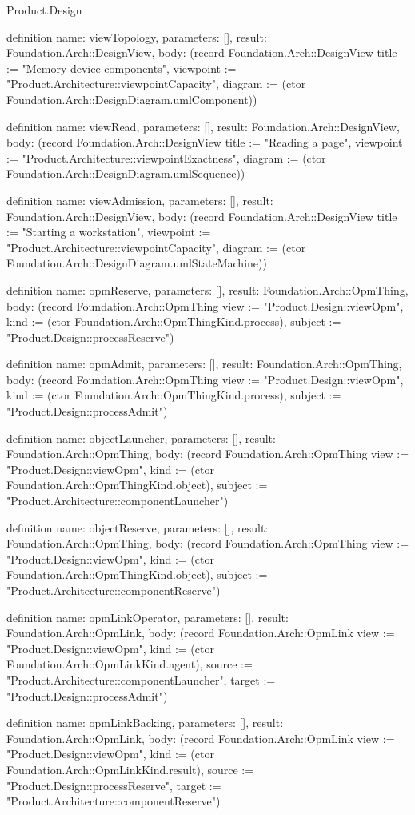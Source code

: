 \begin{lexlean}{Product.Design}
\begin{semanticmodule}
definition{
  name: viewTopology, parameters: [], result: Foundation.Arch::DesignView,
  body: (record Foundation.Arch::DesignView {title := "Memory device components", viewpoint := "Product.Architecture::viewpointCapacity", diagram := (ctor Foundation.Arch::DesignDiagram.umlComponent)})
}

definition{
  name: viewRead, parameters: [], result: Foundation.Arch::DesignView,
  body: (record Foundation.Arch::DesignView {title := "Reading a page", viewpoint := "Product.Architecture::viewpointExactness", diagram := (ctor Foundation.Arch::DesignDiagram.umlSequence)})
}

definition{
  name: viewAdmission, parameters: [], result: Foundation.Arch::DesignView,
  body: (record Foundation.Arch::DesignView {title := "Starting a workstation", viewpoint := "Product.Architecture::viewpointCapacity", diagram := (ctor Foundation.Arch::DesignDiagram.umlStateMachine)})
}

definition{
  name: opmReserve, parameters: [], result: Foundation.Arch::OpmThing,
  body: (record Foundation.Arch::OpmThing {view := "Product.Design::viewOpm", kind := (ctor Foundation.Arch::OpmThingKind.process), subject := "Product.Design::processReserve"})
}

definition{
  name: opmAdmit, parameters: [], result: Foundation.Arch::OpmThing,
  body: (record Foundation.Arch::OpmThing {view := "Product.Design::viewOpm", kind := (ctor Foundation.Arch::OpmThingKind.process), subject := "Product.Design::processAdmit"})
}

definition{
  name: objectLauncher, parameters: [], result: Foundation.Arch::OpmThing,
  body: (record Foundation.Arch::OpmThing {view := "Product.Design::viewOpm", kind := (ctor Foundation.Arch::OpmThingKind.object), subject := "Product.Architecture::componentLauncher"})
}

definition{
  name: objectReserve, parameters: [], result: Foundation.Arch::OpmThing,
  body: (record Foundation.Arch::OpmThing {view := "Product.Design::viewOpm", kind := (ctor Foundation.Arch::OpmThingKind.object), subject := "Product.Architecture::componentReserve"})
}

definition{
  name: opmLinkOperator, parameters: [], result: Foundation.Arch::OpmLink,
  body: (record Foundation.Arch::OpmLink {view := "Product.Design::viewOpm", kind := (ctor Foundation.Arch::OpmLinkKind.agent), source := "Product.Architecture::componentLauncher", target := "Product.Design::processAdmit"})
}

definition{
  name: opmLinkBacking, parameters: [], result: Foundation.Arch::OpmLink,
  body: (record Foundation.Arch::OpmLink {view := "Product.Design::viewOpm", kind := (ctor Foundation.Arch::OpmLinkKind.result), source := "Product.Design::processReserve", target := "Product.Architecture::componentReserve"})
}


\end{semanticmodule}
\end{lexlean}

